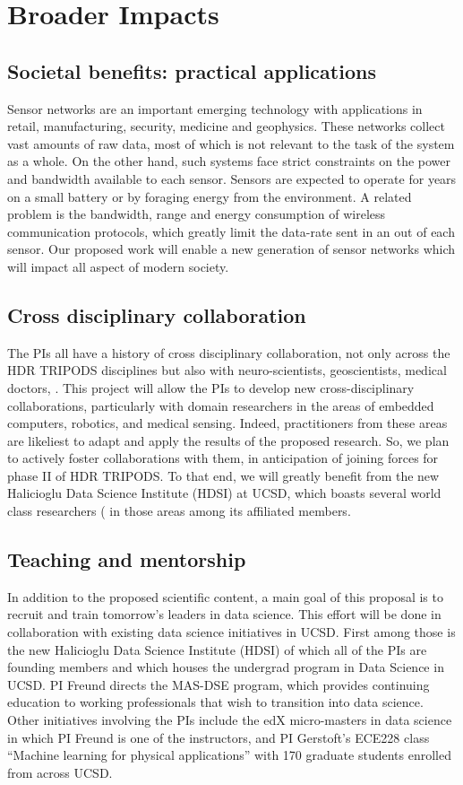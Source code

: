 \section{Broader Impacts}
\subsection*{Societal benefits: practical applications}
Sensor networks are an important emerging technology with applications
in retail, manufacturing, security, medicine and geophysics. These networks
collect vast amounts of raw data, most of which is not relevant to the
task of the system as a whole. On the other hand, such systems face strict constraints on the power and bandwidth available to each sensor.
Sensors are expected to operate for years on a small battery or by
foraging energy from the environment. A related problem is the
bandwidth, range and energy consumption of wireless communication
protocols, which greatly limit the data-rate sent in an out of each
sensor. Our proposed work
will enable a new generation of sensor networks which will impact all
aspect of modern society.
\subsection*{Cross disciplinary collaboration}
The PIs all have a history of cross disciplinary collaboration, not only across the HDR TRIPODS disciplines but also with neuro-scientists, geoscientists, medical doctors, . This project will allow the PIs to develop new cross-disciplinary collaborations, particularly with domain researchers in the areas of embedded computers, robotics, and medical sensing. Indeed, practitioners from these areas are likeliest to adapt and apply the results of the proposed research. So, we plan to actively foster collaborations with them, in anticipation of joining forces for phase II of HDR TRIPODS. To that end, we will greatly benefit from the new Halicioglu Data Science Institute (HDSI) at UCSD, which boasts several world class researchers ( in those areas among its affiliated members. 
\subsection*{Teaching and mentorship}
In addition to the proposed scientific content, a main goal of this proposal is to recruit and train
tomorrow's leaders in data science. This effort will be done in collaboration with existing data science initiatives in UCSD.
First among those is the new Halicioglu Data Science Institute (HDSI) of which all of the PIs are founding members and which 
houses the undergrad program in Data Science in UCSD.  PI Freund directs 
the MAS-DSE program, which provides continuing education to working professionals that wish to transition into data science. 
Other initiatives involving the PIs include the edX micro-masters in data science in which PI Freund is one of the instructors, and 
PI Gerstoft's ECE228 class ``Machine learning for physical applications'' with 170 graduate students enrolled from across UCSD.

